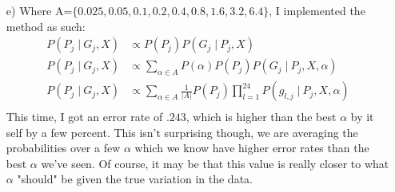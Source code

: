 \documentclass[11pt]{article}
\newcommand{\st}{ \; \big | \:}
\theoremstyle{definition}
\begin{document}
\begin{itemize}
\begin{itemize}
            \item[e)]
                Where A=\(\{0.025, 0.05, 0.1, 0.2, 0.4, 0.8, 1.6, 3.2, 6.4\}\), I implemented the method as such:
                \begin{align*}
                    P(P_j \st G_j, X) &\propto P(P_j)P(G_j \st P_j, X) \\
                    P(P_j \st G_j, X) &\propto \sum_{\alpha\in A} P(\alpha)P(P_j)P(G_j \st P_j, X, \alpha) \\
                    P(P_j \st G_j, X) &\propto \sum_{\alpha\in A} \frac{1}{|A|}P(P_j)\prod_{l=1}^{24} P(g_{l,j} \st P_j, X, \alpha) \\
                \end{align*}
                This time, I got an error rate of $.243$, which is higher than the best $\alpha$ by it self by a few percent. This isn't surprising though, we are averaging the probabilities over a few $\alpha$ which we know have higher error rates than the best $\alpha$ we've seen. Of course, it may be that this value is really closer to what $\alpha$ "should" be given the true variation in the data.



        \end{itemize}


\end{itemize}
\end{document}
